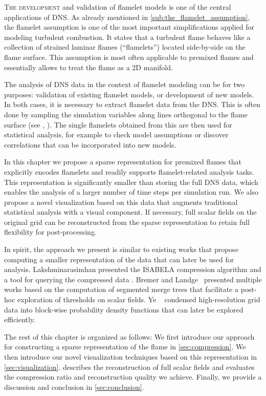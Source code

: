 \lettrine[lines=3, loversize=0.02, lhang=0.02, nindent=0pt]{T}{he development}
and validation of flamelet models is one of the central applications of
\ac{DNS}.
%
As already mentioned in \cref{sub:the_flamelet_assumption}, the flamelet
assumption is one of the most important simplifications applied for modeling
turbulent combustion.
%
It states that a turbulent flame behaves like a collection of strained laminar
flames (``flamelets'') located side-by-side on the flame surface.
%
This assumption is most often applicable to premixed flames and essentially
allows to treat the flame as a \ac{2D} manifold.
%

%
The analysis of \ac{DNS} data in the context of flamelet modeling can be for
two purposes: validation of existing flamelet models, or development of new
models.
%
In both cases, it is necessary to extract flamelet data from the \ac{DNS}.
%
This is often done by sampling the simulation variables along lines orthogonal
to the flame surface (see \eg, \cite{Zistl2009}).
%
The single flamelets obtained from this are then used for statistical analysis,
for example to check model assumptions or discover correlations that can be
incorporated into new models.
%

%
In this chapter we propose a sparse representation for premixed flames that
explicitly encodes flamelets and readily supports flamelet-related analysis
tasks.
%
This representation is significantly smaller than storing the full DNS data,
which enables the analysis of a larger number of time steps per simulation run.
%
We also propose a novel visualization based on this data that augments
traditional statistical analysis with a visual component.
%
If necessary, full scalar fields on the original grid can be reconstructed
from the sparse representation to retain full flexibility for post-processing.
%

%
In spirit, the approach we present is similar to existing works that propose
computing a smaller representation of the data that can later be used for
analysis.
%
Lakshminarasimhan \etal presented the ISABELA compression algorithm
\cite{Lakshminarasimhan2011} and a tool for querying the compressed data
\cite{Lakshminarasimhan2011a}.
%
Bremer and Landge~\cite{Bremer2009,Bremer2011,Bremer2010,Landge2014} presented
multiple works based on the computation of segmented merge trees that facilitate
a post-hoc exploration of thresholds on scalar fields.
%
Ye \etal~\cite{Ye2016} condensed high-resolution grid data into block-wise
probability density functions that can later be explored efficiently.
%

%
The rest of this chapter is organized as follows:
%
We first introduce our approach for constructing a sparse representation of the
flame in \cref{sec:compression}.
%
We then introduce our novel visualization techniques based on this
representation in \cref{sec:visualization}.
%
 describes the reconstruction of full scalar fields and
evaluates the compression ratio and reconstruction quality we achieve.
%
Finally, we provide a discussion and conclusion in \cref{sec:conclusion}.
%